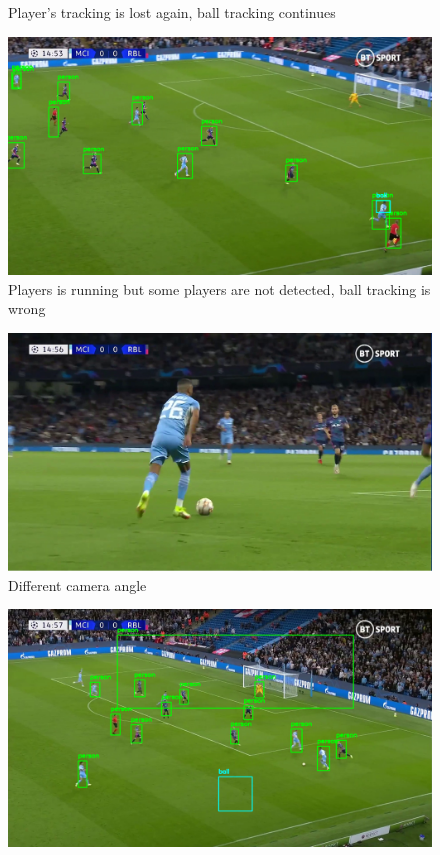 \documentclass[
    11pt,
    oneside
]{report}
\begin{document}
\begin{appendices}
\begin{figure}[H]
    \caption{Player's tracking is lost again, ball tracking continues}
    \label{img:8}
\end{figure}
\begin{figure}[H]
    \includegraphics[keepaspectratio, width=\columnwidth]{Screenshot_2022-03-03_23-06-18.png}
    \caption{Players is running but some players are not detected, ball tracking is wrong}
    \label{img:9}
\end{figure}
\begin{figure}[H]
    \includegraphics[keepaspectratio, width=\columnwidth]{Screenshot_2022-03-03_21-39-53.png}
    \caption{Different camera angle}
    \label{img:10}
\end{figure}
\begin{figure}[H]
    \includegraphics[keepaspectratio, width=\columnwidth]{Screenshot_2022-03-03_23-06-43.png}

\end{figure}
\end{appendices}
\end{document}
